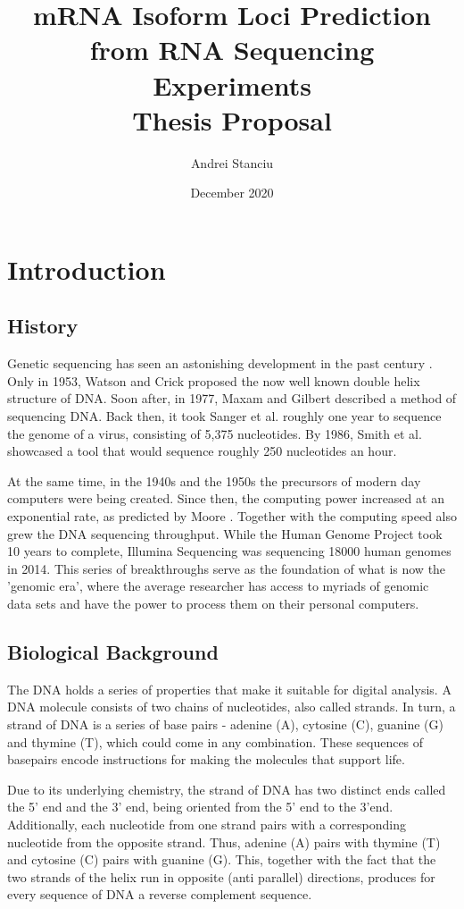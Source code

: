 \documentclass[12pt]{article}
\title{%
    mRNA Isoform Loci Prediction from RNA Sequencing Experiments \\
    \large Thesis Proposal}
\author{Andrei Stanciu}
\date{December 2020}
\begin{document}
\maketitle

\section{Introduction}

\subsection{History}
Genetic sequencing has seen an astonishing development in the past century \cite{Hood2003}. Only in 1953, Watson and Crick \cite{WATSON1953} proposed the now well known double helix structure of DNA. Soon after, in 1977, Maxam and Gilbert \cite{Maxam1977} described a method of sequencing DNA. Back then, it took Sanger et al. \cite{Sanger1977} roughly one year to sequence the genome of a virus, consisting of 5,375 nucleotides. By 1986, Smith et al. \cite{Smith1986} showcased a tool that would sequence roughly 250 nucleotides an hour. 

At the same time, in the 1940s and the 1950s the precursors of modern day computers were being created. Since then, the computing power increased at an exponential rate, as predicted by Moore \cite{Moore2006}. Together with the computing speed also grew the DNA sequencing throughput. While the Human Genome Project took 10 years to complete, Illumina Sequencing \cite{illuminaSeq} was sequencing 18000 human genomes in 2014. This series of breakthroughs serve as the foundation of what is now the 'genomic era', where the average researcher has access to myriads of genomic data sets and have the power to process them on their personal computers.   

\subsection{Biological Background}
The DNA holds a series of properties that make it suitable for digital analysis. A DNA molecule consists of two chains of nucleotides, also called strands. In turn, a strand of DNA is a series of  base pairs - adenine (A), cytosine (C), guanine (G) and thymine (T), which could come in any combination. These sequences of basepairs encode instructions for making the molecules that support life. 


Due to its underlying chemistry, the strand of DNA has two distinct ends called the 5' end and the 3' end, being oriented from the 5' end to the 3'end. Additionally, each nucleotide from one strand pairs with a corresponding nucleotide from the opposite strand. Thus, adenine (A) pairs with thymine (T) and cytosine (C) pairs with guanine (G). This, together with the fact that the two strands of the helix run in opposite (anti parallel) directions, produces for every sequence of DNA a reverse complement sequence. 
\end{document}
